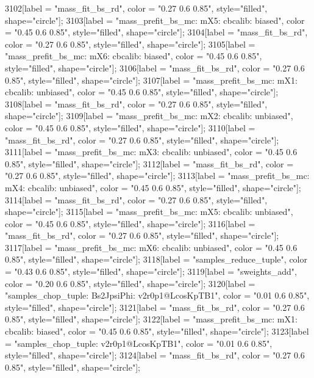 {	3102[label = "mass_fit_bs_rd", color = "0.27 0.6 0.85", style="filled", shape="circle"];
	3103[label = "mass_prefit_bs_mc\nmassbin: mX5\nmassmodel: cbcalib\ntrigger: biased", color = "0.45 0.6 0.85", style="filled", shape="circle"];
	3104[label = "mass_fit_bs_rd", color = "0.27 0.6 0.85", style="filled", shape="circle"];
	3105[label = "mass_prefit_bs_mc\nmassbin: mX6\nmassmodel: cbcalib\ntrigger: biased", color = "0.45 0.6 0.85", style="filled", shape="circle"];
	3106[label = "mass_fit_bs_rd", color = "0.27 0.6 0.85", style="filled", shape="circle"];
	3107[label = "mass_prefit_bs_mc\nmassbin: mX1\nmassmodel: cbcalib\ntrigger: unbiased", color = "0.45 0.6 0.85", style="filled", shape="circle"];
	3108[label = "mass_fit_bs_rd", color = "0.27 0.6 0.85", style="filled", shape="circle"];
	3109[label = "mass_prefit_bs_mc\nmassbin: mX2\nmassmodel: cbcalib\ntrigger: unbiased", color = "0.45 0.6 0.85", style="filled", shape="circle"];
	3110[label = "mass_fit_bs_rd", color = "0.27 0.6 0.85", style="filled", shape="circle"];
	3111[label = "mass_prefit_bs_mc\nmassbin: mX3\nmassmodel: cbcalib\ntrigger: unbiased", color = "0.45 0.6 0.85", style="filled", shape="circle"];
	3112[label = "mass_fit_bs_rd", color = "0.27 0.6 0.85", style="filled", shape="circle"];
	3113[label = "mass_prefit_bs_mc\nmassbin: mX4\nmassmodel: cbcalib\ntrigger: unbiased", color = "0.45 0.6 0.85", style="filled", shape="circle"];
	3114[label = "mass_fit_bs_rd", color = "0.27 0.6 0.85", style="filled", shape="circle"];
	3115[label = "mass_prefit_bs_mc\nmassbin: mX5\nmassmodel: cbcalib\ntrigger: unbiased", color = "0.45 0.6 0.85", style="filled", shape="circle"];
	3116[label = "mass_fit_bs_rd", color = "0.27 0.6 0.85", style="filled", shape="circle"];
	3117[label = "mass_prefit_bs_mc\nmassbin: mX6\nmassmodel: cbcalib\ntrigger: unbiased", color = "0.45 0.6 0.85", style="filled", shape="circle"];
	3118[label = "samples_reduce_tuple", color = "0.43 0.6 0.85", style="filled", shape="circle"];
	3119[label = "sweights_add", color = "0.20 0.6 0.85", style="filled", shape="circle"];
	3120[label = "samples_chop_tuple\nmode: Bs2JpsiPhi\nversion: v2r0p1@LcosKpTB1", color = "0.01 0.6 0.85", style="filled", shape="circle"];
	3121[label = "mass_fit_bs_rd", color = "0.27 0.6 0.85", style="filled", shape="circle"];
	3122[label = "mass_prefit_bs_mc\nmassbin: mX1\nmassmodel: cbcalib\ntrigger: biased", color = "0.45 0.6 0.85", style="filled", shape="circle"];
	3123[label = "samples_chop_tuple\nversion: v2r0p1@LcosKpTB1", color = "0.01 0.6 0.85", style="filled", shape="circle"];
	3124[label = "mass_fit_bs_rd", color = "0.27 0.6 0.85", style="filled", shape="circle"];
}
